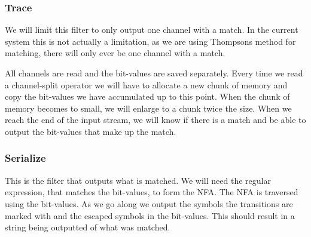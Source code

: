 



\subsubsection{Trace}

We will limit this filter to only output one channel with a match. In
the current system this is not actually a limitation, as we are using
Thompsons method for matching, there will only ever be one channel
with a match.

All channels are read and the bit-values are saved separately. Every
time we read a channel-split operator we will have to allocate a new
chunk of memory and copy the bit-values we have accumulated up to this
point. When the chunk of memory becomes to small, we will enlarge to a
chunk twice the size. When we reach the end of the input stream, we
will know if there is a match and be able to output the bit-values
that make up the match.


\subsubsection{Serialize}
  
This is the filter that outputs what is matched. We will need the
regular expression, that matches the bit-values, to form the NFA. The
NFA is traversed using the bit-values. As we go along we output the
symbols the transitions are marked with and the escaped symbols in the
bit-values. This should result in a string being outputted of what was
matched.
